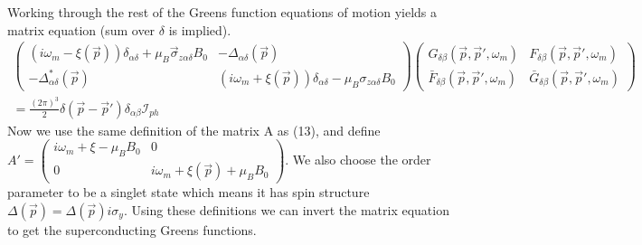 \documentclass{article}
\begin{document}
Working through the rest of the Greens function equations of motion yields a matrix equation (sum over $\delta$ is implied).
\begin{align*}
\left(\begin{array}{cc} (i\omega_m-\xi(\vec{p}))\delta_{\alpha\delta}+\mu_B \vec{\sigma}_{z\alpha\delta} B_0 & - \Delta_{\alpha\delta}(\vec{p}) \\ - \Delta^*_{\alpha\delta}(\vec{p}) & (i\omega_m+\xi(\vec{p}))\delta_{\alpha\delta}-\mu_B \sigma_{z\alpha\delta}B_0 \end{array}\right)\left(\begin{array}{cc}G_{\delta\beta}(\vec{p},\vec{p}',\omega_m) & F_{\delta\beta}(\vec{p},\vec{p}',\omega_m) \\ \bar{F}_{\delta\beta}(\vec{p},\vec{p}',\omega_m) & \bar{G}_{\delta\beta}(\vec{p},\vec{p}',\omega_m)\end{array}\right) \\ =\frac{(2\pi)^3}{2}\delta(\vec{p}-\vec{p}')\delta_{\alpha\beta}\mathcal{I}_{ph}
\end{align*}
Now we use the same definition of the matrix A as (13), and define $A'=\left( \begin{array}{cc}
i\omega_m+\xi-\mu_B B_0 & 0 \\
0 & i\omega_m+\xi(\vec{p})+\mu_BB_0\end{array} \right)$. We also choose the order parameter to be a singlet state which means it has spin structure $\Delta(\vec{p})=\Delta(\vec{p})i\sigma_y$. Using these definitions we can invert the matrix equation to get the superconducting Greens functions.
\end{document}
